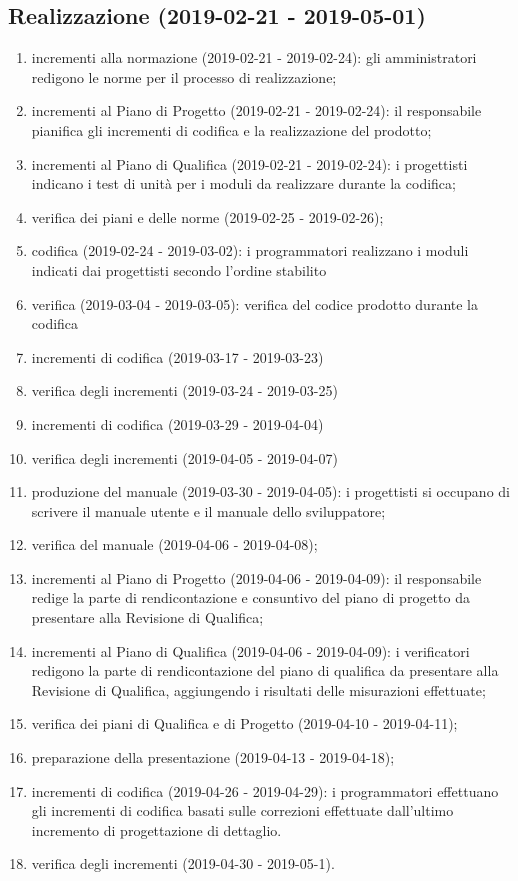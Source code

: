 	\subsection{Realizzazione (2019-02-21 - 2019-05-01)}
		\begin{enumerate}[label= 4.\arabic*)]
			\item incrementi alla normazione (2019-02-21 - 2019-02-24): gli amministratori redigono le norme per il processo di realizzazione;
			\item incrementi al Piano di Progetto (2019-02-21 - 2019-02-24): il responsabile pianifica gli incrementi di codifica e la realizzazione del prodotto;
			\item incrementi al Piano di Qualifica (2019-02-21 - 2019-02-24): i progettisti indicano i test di unità per i moduli da realizzare durante la codifica;
			\item verifica dei piani e delle norme (2019-02-25 - 2019-02-26);
			\item codifica (2019-02-24 - 2019-03-02): i programmatori realizzano i moduli indicati dai progettisti secondo l'ordine stabilito
			\item verifica (2019-03-04 - 2019-03-05): verifica del codice prodotto durante la codifica
			\item incrementi di codifica (2019-03-17 - 2019-03-23)
			\item verifica degli incrementi (2019-03-24 - 2019-03-25)
			\item incrementi di codifica (2019-03-29 - 2019-04-04)
			\item verifica degli incrementi (2019-04-05 - 2019-04-07)
			\item produzione del manuale (2019-03-30 - 2019-04-05): i progettisti si occupano di scrivere il manuale utente e il manuale dello sviluppatore;
			\item verifica del manuale (2019-04-06 - 2019-04-08);
			\item incrementi al Piano di Progetto (2019-04-06 - 2019-04-09): il responsabile redige la parte di rendicontazione e consuntivo del piano di progetto da presentare alla Revisione di Qualifica;
			\item incrementi al Piano di Qualifica (2019-04-06 - 2019-04-09): i verificatori redigono la parte di rendicontazione del piano di qualifica da presentare alla Revisione di Qualifica, aggiungendo i risultati delle misurazioni effettuate;
			\item verifica dei piani di Qualifica e di Progetto (2019-04-10 - 2019-04-11);
			\item preparazione della presentazione (2019-04-13 - 2019-04-18);
			\item incrementi di codifica (2019-04-26 - 2019-04-29): i programmatori effettuano gli incrementi di codifica basati sulle correzioni effettuate dall'ultimo incremento di progettazione di dettaglio.
			\item verifica degli incrementi (2019-04-30 - 2019-05-1).
		\end{enumerate}
		
